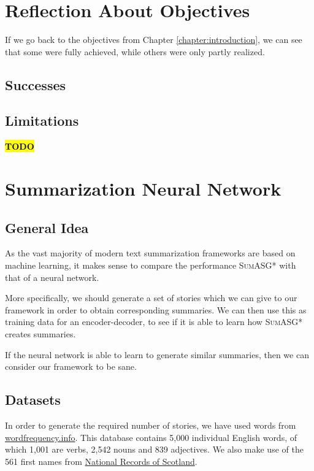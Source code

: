 \label{chapter:evaluation}

\section{Reflection About Objectives}

If we go back to the objectives from Chapter \ref{chapter:introduction}, we can see that some were fully achieved, while others were only partly realized.

\subsection{Successes}

\subsection{Limitations}

\textcolor{red}{\textbf{\hl{TODO}}}

\section{Summarization Neural Network}

\subsection{General Idea}

As the vast majority of modern text summarization frameworks are based on machine learning, it makes sense to compare the performance \textsc{SumASG*} with that of a neural network.

More specifically, we should generate a set of stories which we can give to our framework in order to obtain corresponding summaries. We can then use this as training data for an encoder-decoder, to see if it is able to learn how \textsc{SumASG*} creates summaries.

If the neural network is able to learn to generate similar summaries, then we can consider our framework to be sane.

\subsection{Datasets}

In order to generate the required number of stories, we have used words from \href{http://www.wordfrequency.info/}{wordfrequency.info}. This database contains 5,000 individual English words, of which 1,001 are verbs, 2,542 nouns and 839 adjectives. We also make use of the 561 first names from \href{https://www.nrscotland.gov.uk/statistics-and-data/statistics/statistics-by-theme/vital-events/names/babies-first-names/babies-first-names-summary-records-comma-separated-value-csv-format}{National Records of Scotland}.

